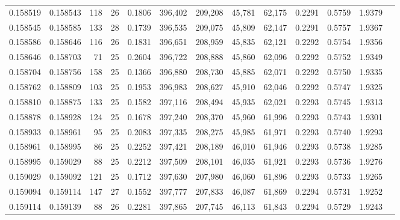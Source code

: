 \begin{tabular}{rrrrrrrrrrrrr}
0.158519 & 0.158543 & 118 &  26 &                                     0.1806 & 396,402 & 209,208 &  45,781 &  62,175 & 0.2291 & 0.5759 & 1.9379 \\
0.158545 & 0.158585 & 133 &  28 &                                     0.1739 & 396,535 & 209,075 &  45,809 &  62,147 & 0.2291 & 0.5757 & 1.9367 \\
0.158586 & 0.158646 & 116 &  26 &                                     0.1831 & 396,651 & 208,959 &  45,835 &  62,121 & 0.2292 & 0.5754 & 1.9356 \\
0.158646 & 0.158703 &  71 &  25 &                                     0.2604 & 396,722 & 208,888 &  45,860 &  62,096 & 0.2292 & 0.5752 & 1.9349 \\
0.158704 & 0.158756 & 158 &  25 &                                     0.1366 & 396,880 & 208,730 &  45,885 &  62,071 & 0.2292 & 0.5750 & 1.9335 \\
0.158762 & 0.158809 & 103 &  25 &                                     0.1953 & 396,983 & 208,627 &  45,910 &  62,046 & 0.2292 & 0.5747 & 1.9325 \\
0.158810 & 0.158875 & 133 &  25 &                                     0.1582 & 397,116 & 208,494 &  45,935 &  62,021 & 0.2293 & 0.5745 & 1.9313 \\
0.158878 & 0.158928 & 124 &  25 &                                     0.1678 & 397,240 & 208,370 &  45,960 &  61,996 & 0.2293 & 0.5743 & 1.9301 \\
0.158933 & 0.158961 &  95 &  25 &                                     0.2083 & 397,335 & 208,275 &  45,985 &  61,971 & 0.2293 & 0.5740 & 1.9293 \\
0.158961 & 0.158995 &  86 &  25 &                                     0.2252 & 397,421 & 208,189 &  46,010 &  61,946 & 0.2293 & 0.5738 & 1.9285 \\
0.158995 & 0.159029 &  88 &  25 &                                     0.2212 & 397,509 & 208,101 &  46,035 &  61,921 & 0.2293 & 0.5736 & 1.9276 \\
0.159029 & 0.159092 & 121 &  25 &                                     0.1712 & 397,630 & 207,980 &  46,060 &  61,896 & 0.2293 & 0.5733 & 1.9265 \\
0.159094 & 0.159114 & 147 &  27 &                                     0.1552 & 397,777 & 207,833 &  46,087 &  61,869 & 0.2294 & 0.5731 & 1.9252 \\
0.159114 & 0.159139 &  88 &  26 &                                     0.2281 & 397,865 & 207,745 &  46,113 &  61,843 & 0.2294 & 0.5729 & 1.9243 \\

\end{tabular}
